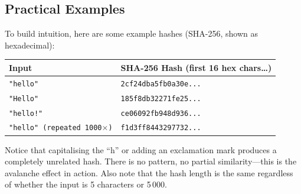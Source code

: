 \subsection{Practical Examples}

To build intuition, here are some example hashes (SHA-256, shown as
hexadecimal):

\begin{center}
\small
\begin{tabular}{lp{10cm}}
\toprule
\textbf{Input} & \textbf{SHA-256 Hash (first 16 hex chars\ldots)} \\
\midrule
\texttt{"hello"} & \texttt{2cf24dba5fb0a30e...} \\
\texttt{"Hello"} & \texttt{185f8db32271fe25...} \\
\texttt{"hello!"} & \texttt{ce06092fb948d936...} \\
\texttt{"hello" (repeated 1000$\times$)} & \texttt{f1d3ff8443297732...} \\
\bottomrule
\end{tabular}
\end{center}

Notice that capitalising the ``h'' or adding an exclamation mark produces a
completely unrelated hash.  There is no pattern, no partial similarity---this
is the avalanche effect in action.  Also note that the hash length is the
same regardless of whether the input is 5 characters or 5\,000.

